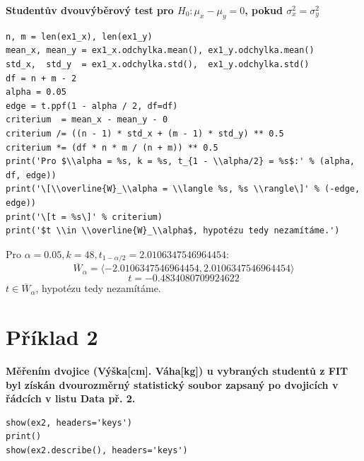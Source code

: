\documentclass[11pt,titlepage]{article}
\begin{document}
\textbf{Studentův dvouvýběrový test pro \(H_0: \mu_x - \mu_y = 0\), pokud \(\sigma^2_x = \sigma^2_y\)}
\begin{listing}[htbp]
\begin{verbatim}
n, m = len(ex1_x), len(ex1_y)
mean_x, mean_y = ex1_x.odchylka.mean(), ex1_y.odchylka.mean()
std_x,  std_y  = ex1_x.odchylka.std(),  ex1_y.odchylka.std()
df = n + m - 2
alpha = 0.05
edge = t.ppf(1 - alpha / 2, df=df)
criterium  = mean_x - mean_y - 0
criterium /= ((n - 1) * std_x + (m - 1) * std_y) ** 0.5
criterium *= (df * n * m / (n + m)) ** 0.5
print('Pro $\\alpha = %s, k = %s, t_{1 - \\alpha/2} = %s$:' % (alpha, df, edge))
print('\[\\overline{W}_\\alpha = \\langle %s, %s \\rangle\]' % (-edge, edge))
print('\[t = %s\]' % criterium)
print('$t \\in \\overline{W}_\\alpha$, hypotézu tedy nezamítáme.')
\end{verbatim}
\end{listing}

Pro \(\alpha = 0.05, k = 48, t_{1 - \alpha/2} = 2.0106347546964454\):
\[\overline{W}_\alpha = \langle -2.0106347546964454, 2.0106347546964454 \rangle\]
\[t = -0.4834080709924622\]
\(t \in \overline{W}_\alpha\), hypotézu tedy nezamítáme.


\newpage

\section{Příklad 2}
\label{sec:org7262679}
\textbf{Měřením dvojice (Výška[cm]. Váha[kg]) u vybraných studentů z FIT byl získán dvourozměrný
statistický soubor zapsaný po dvojicích v řádcích v listu Data př. 2.}

\begin{listing}[htbp]
\begin{verbatim}
show(ex2, headers='keys')
print()
show(ex2.describe(), headers='keys')
\end{verbatim}
\end{listing}
\end{document}
